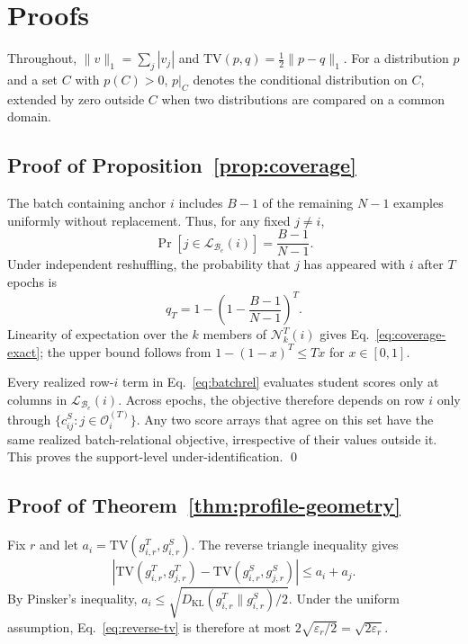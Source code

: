 \section{Proofs}
\label{app:proofs}

Throughout, $\lVert v\rVert_1=\sum_j|v_j|$ and
$\mathrm{TV}(p,q)=\tfrac12\lVert p-q\rVert_1$. For a distribution $p$
and a set $C$ with $p(C)>0$, $p|_C$ denotes the conditional distribution
on $C$, extended by zero outside $C$ when two distributions are compared
on a common domain.

\subsection{Proof of Proposition~\ref{prop:coverage}}
\label{app:proof-coverage}

The batch containing anchor $i$ includes $B-1$ of the remaining $N-1$
examples uniformly without replacement. Thus, for any fixed $j\neq i$,
\begin{equation}
\Pr[j\in\mathcal L_{\mathcal B_e}(i)]=\frac{B-1}{N-1}.
\end{equation}
Under independent reshuffling, the probability that $j$ has appeared with
$i$ after $T$ epochs is
\begin{equation}
q_T=1-\left(1-\frac{B-1}{N-1}\right)^T.
\end{equation}
Linearity of expectation over the $k$ members of $\mathcal N_k^T(i)$ gives
Eq.~\eqref{eq:coverage-exact}; the upper bound follows from
$1-(1-x)^T\leq Tx$ for $x\in[0,1]$.

Every realized row-$i$ term in Eq.~\eqref{eq:batchrel} evaluates student
scores only at columns in $\mathcal L_{\mathcal B_e}(i)$. Across epochs, the
objective therefore depends on row $i$ only through
$\{c^S_{ij}:j\in\mathcal O_i^{(T)}\}$. Any two score arrays that agree on
this set have the same realized batch-relational objective, irrespective of
their values outside it. This proves the support-level under-identification.
\qed

\subsection{Proof of Theorem~\ref{thm:profile-geometry}}
\label{app:proof-profile}

Fix $r$ and let $a_i=\mathrm{TV}(g^T_{i,r},g^S_{i,r})$. The reverse triangle
inequality gives
\begin{equation}
\label{eq:reverse-tv}
\left|
\mathrm{TV}(g^T_{i,r},g^T_{j,r})
-\mathrm{TV}(g^S_{i,r},g^S_{j,r})
\right|
\leq a_i+a_j.
\end{equation}
By Pinsker's inequality,
$a_i\leq\sqrt{D_{\mathrm{KL}}(g^T_{i,r}\|g^S_{i,r})/2}$.
Under the uniform assumption, Eq.~\eqref{eq:reverse-tv} is therefore at most
$2\sqrt{\varepsilon_r/2}=\sqrt{2\varepsilon_r}$.

